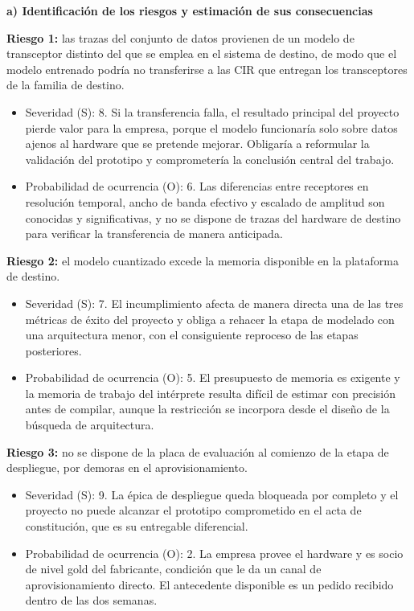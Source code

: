 \documentclass[
11pt, %
]{charter}
\begin{document}
\textbf{a) Identificación de los riesgos y estimación de sus consecuencias}

\textbf{Riesgo 1:} las trazas del conjunto de datos provienen de un modelo de transceptor distinto del que se emplea en el sistema de destino, de modo que el modelo entrenado podría no transferirse a las CIR que entregan los transceptores de la familia de destino.
\begin{itemize}
    \item Severidad (S): 8. Si la transferencia falla, el resultado principal del proyecto pierde valor para la empresa, porque el modelo funcionaría solo sobre datos ajenos al hardware que se pretende mejorar. Obligaría a reformular la validación del prototipo y comprometería la conclusión central del trabajo.
    \item Probabilidad de ocurrencia (O): 6. Las diferencias entre receptores en resolución temporal, ancho de banda efectivo y escalado de amplitud son conocidas y significativas, y no se dispone de trazas del hardware de destino para verificar la transferencia de manera anticipada.
\end{itemize}

\textbf{Riesgo 2:} el modelo cuantizado excede la memoria disponible en la plataforma de destino.
\begin{itemize}
    \item Severidad (S): 7. El incumplimiento afecta de manera directa una de las tres métricas de éxito del proyecto y obliga a rehacer la etapa de modelado con una arquitectura menor, con el consiguiente reproceso de las etapas posteriores.
    \item Probabilidad de ocurrencia (O): 5. El presupuesto de memoria es exigente y la memoria de trabajo del intérprete resulta difícil de estimar con precisión antes de compilar, aunque la restricción se incorpora desde el diseño de la búsqueda de arquitectura.
\end{itemize}

\textbf{Riesgo 3:} no se dispone de la placa de evaluación al comienzo de la etapa de despliegue, por demoras en el aprovisionamiento.
\begin{itemize}
    \item Severidad (S): 9. La épica de despliegue queda bloqueada por completo y el proyecto no puede alcanzar el prototipo comprometido en el acta de constitución, que es su entregable diferencial.
    \item Probabilidad de ocurrencia (O): 2. La empresa provee el hardware y es socio de nivel gold del fabricante, condición que le da un canal de aprovisionamiento directo. El antecedente disponible es un pedido recibido dentro de las dos semanas.
\end{itemize}
\end{document}

